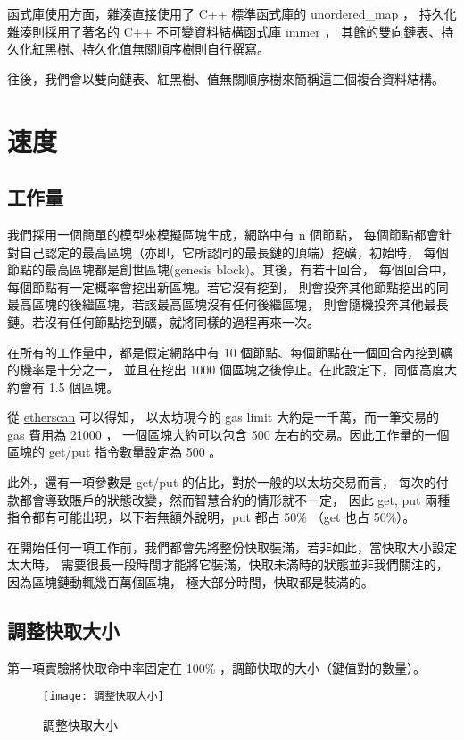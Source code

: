 函式庫使用方面，雜湊直接使用了 C++ 標準函式庫的 unordered\_map ，
持久化雜湊則採用了著名的 C++ 不可變資料結構函式庫 \href{https://sinusoid.es/immer/}{immer} ，
其餘的雙向鏈表、持久化紅黑樹、持久化值無關順序樹則自行撰寫。

往後，我們會以雙向鏈表、紅黑樹、值無關順序樹來簡稱這三個複合資料結構。

\section{速度}

\subsection{工作量}
我們採用一個簡單的模型來模擬區塊生成，網路中有 n 個節點，
每個節點都會針對自己認定的最高區塊（亦即，它所認同的最長鏈的頂端）挖礦，初始時，
每個節點的最高區塊都是創世區塊(genesis block)。其後，有若干回合，
每個回合中，每個節點有一定概率會挖出新區塊。若它沒有挖到，
則會投奔其他節點挖出的同最高區塊的後繼區塊，若該最高區塊沒有任何後繼區塊，
則會隨機投奔其他最長鏈。若沒有任何節點挖到礦，就將同樣的過程再來一次。

在所有的工作量中，都是假定網路中有 10 個節點、每個節點在一個回合內挖到礦的機率是十分之一，
並且在挖出 1000 個區塊之後停止。在此設定下，同個高度大約會有 1.5 個區塊。

從 \href{https://etherscan.io/chart/gaslimit}{etherscan} 可以得知，
以太坊現今的 gas limit 大約是一千萬，而一筆交易的 gas 費用為 21000 ，
一個區塊大約可以包含 500 左右的交易。因此工作量的一個區塊的 get/put 指令數量設定為 500 。

此外，還有一項參數是 get/put 的佔比，對於一般的以太坊交易而言，
每次的付款都會導致賬戶的狀態改變，然而智慧合約的情形就不一定，
因此 get, put 兩種指令都有可能出現，以下若無額外說明，put 都占 50\% （get 也占 50\%）。

在開始任何一項工作前，我們都會先將整份快取裝滿，若非如此，當快取大小設定太大時，
需要很長一段時間才能將它裝滿，快取未滿時的狀態並非我們關注的，因為區塊鏈動輒幾百萬個區塊，
極大部分時間，快取都是裝滿的。

\subsection{調整快取大小}

第一項實驗將快取命中率固定在 100\% ，調節快取的大小（鍵值對的數量）。

\begin{figure}[h!]
\texttt{[image: 調整快取大小]}
\caption{調整快取大小}
\end{figure}

